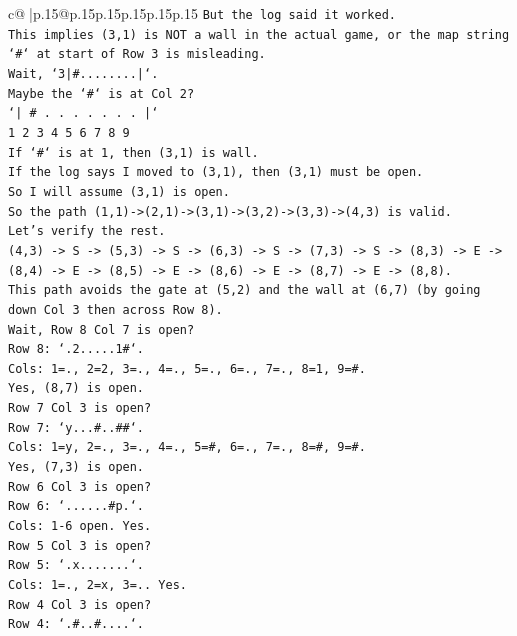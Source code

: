 \documentclass{article}
\begin{document}
{\begin{supertabular}{c@{$\;$}|p{.15\linewidth}@{}p{.15\linewidth}p{.15\linewidth}p{.15\linewidth}p{.15\linewidth}p{.15\linewidth}}
{{{\texttt{But the log said it worked.} \\
\texttt{This implies (3,1) is NOT a wall in the actual game, or the map string `\#` at start of Row 3 is misleading.} \\
\texttt{Wait, `3|\#........|`.} \\
\texttt{Maybe the `\#` is at Col 2?} \\
\texttt{`| \# . . . . . . . |`} \\
\texttt{1 2 3 4 5 6 7 8 9} \\
\texttt{If `\#` is at 1, then (3,1) is wall.} \\
\texttt{If the log says I moved to (3,1), then (3,1) must be open.} \\
\texttt{So I will assume (3,1) is open.} \\
\texttt{So the path (1,1){-}>(2,1){-}>(3,1){-}>(3,2){-}>(3,3){-}>(4,3) is valid.} \\
\texttt{Let's verify the rest.} \\
\texttt{(4,3) {-}> S {-}> (5,3) {-}> S {-}> (6,3) {-}> S {-}> (7,3) {-}> S {-}> (8,3) {-}> E {-}> (8,4) {-}> E {-}> (8,5) {-}> E {-}> (8,6) {-}> E {-}> (8,7) {-}> E {-}> (8,8).} \\
\texttt{This path avoids the gate at (5,2) and the wall at (6,7) (by going down Col 3 then across Row 8).} \\
\texttt{Wait, Row 8 Col 7 is open?} \\
\texttt{Row 8: `.2.....1\#`.} \\
\texttt{Cols: 1=., 2=2, 3=., 4=., 5=., 6=., 7=., 8=1, 9=\#.} \\
\texttt{Yes, (8,7) is open.} \\
\texttt{Row 7 Col 3 is open?} \\
\texttt{Row 7: `y...\#..\#\#`.} \\
\texttt{Cols: 1=y, 2=., 3=., 4=., 5=\#, 6=., 7=., 8=\#, 9=\#.} \\
\texttt{Yes, (7,3) is open.} \\
\texttt{Row 6 Col 3 is open?} \\
\texttt{Row 6: `......\#p.`.} \\
\texttt{Cols: 1{-}6 open. Yes.} \\
\texttt{Row 5 Col 3 is open?} \\
\texttt{Row 5: `.x.......`.} \\
\texttt{Cols: 1=., 2=x, 3=.. Yes.} \\
\texttt{Row 4 Col 3 is open?} \\
\texttt{Row 4: `.\#..\#....`.} \\
}}}
\end{supertabular}}
\end{document}
